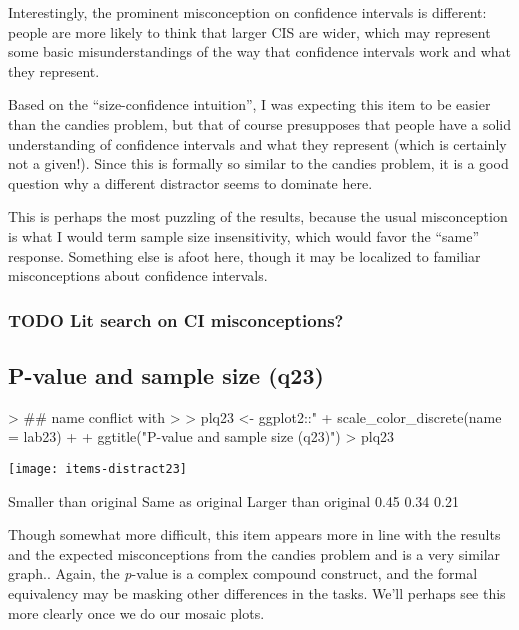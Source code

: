 \documentclass[11pt]{article}
\begin{document}
Interestingly, the prominent misconception on confidence intervals is different: people are more likely to think that larger CIS are wider, which may represent some basic misunderstandings of the way that confidence intervals work and what they represent.

Based on the ``size-confidence intuition'', I was expecting this item to be easier than the candies problem, but that of course presupposes that people have a solid understanding of confidence intervals and what they represent (which is certainly not a given!).  Since this is formally so similar to the candies problem, it is a good question why a different distractor seems to dominate here.

This is perhaps the most puzzling of the results, because the usual misconception is what I would term sample size insensitivity, which would favor the ``same'' response.  Something else is afoot here, though it may be localized to familiar misconceptions about confidence intervals.

\subsubsection{{\bfseries\sffamily TODO} Lit search on CI misconceptions?}
\label{sec-2-3-1}
\subsection{P-value and sample size (q23)}
\label{sec-2-4}

\begin{Schunk}
\begin{Sinput}
> ## name conflict with %+%, which is why I need to use colon notation here
> 
> plq23 <- ggplot2::"%+%"(plq06, d23) + 
+     scale_color_discrete(name = lab23) +
+     ggtitle("P-value and sample size (q23)")
> plq23
\end{Sinput}
\end{Schunk}
\texttt{[image: items-distract23]}
\begin{Schunk}
\begin{Soutput}
Smaller than original      Same as original  Larger than original 
                 0.45                  0.34                  0.21 
\end{Soutput}
\end{Schunk}

Though somewhat more difficult, this item appears more in line with the results and the expected misconceptions from the candies problem and is a very similar graph.. Again, the \emph{p}-value is a complex compound construct, and the formal equivalency may be masking other differences in the tasks.  We'll perhaps see this more clearly once we do our mosaic plots.
\end{document}
